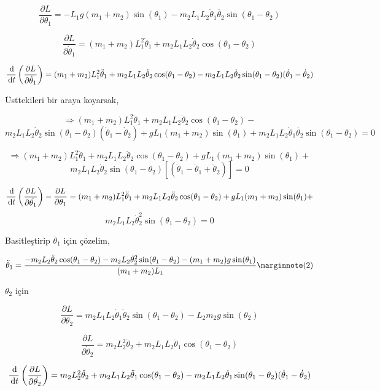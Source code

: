 \documentclass[12pt,fleqn]{article}\usepackage{../../common}
\begin{document}
$$
\frac{\partial L}{\partial \theta_1} = 
-L_1 g (m_1 + m_2) \sin(\theta_1) - m_2 L_1 L_2 \dot{\theta}_1\dot{\theta_2}\sin(\theta_1-\theta_2)
$$

$$
\frac{\partial L}{\partial \dot{\theta}_1} = 
(m_1 + m_2) L_1^2 \dot{\theta}_1 + m_2 L_1 L_2 \dot{\theta}_2 \cos(\theta_1- \theta_2)
$$
 
$$
\frac{\,\mathrm{d} }{\,\mathrm{d} t} \left(
\frac{\partial L}{\partial \dot{\theta}_1} \right) = 
(m_1 + m_2) L_1^2 \ddot{\theta}_1 + m_2 L_1 L_2 \ddot{\theta}_2 \cos(\theta_1-\theta_2)-
m_2 L_1 L_2 \dot{\theta}_2 \sin(\theta_1-\theta_2)(\dot{\theta}_1 - \dot{\theta}_2)
$$

Üsttekileri bir araya koyarsak,

$$
\Rightarrow (m_1 + m_2) L_1^2 \ddot{\theta}_1 + 
m_2L_1 L_2 \ddot{\theta}_2 \cos(\theta_1-\theta_2)-
$$
$$
m_2 L_1 L_2 \dot{\theta}_2 \sin(\theta_1-\theta_2)(\dot{\theta}_1 - \dot{\theta}_2) +
g L_1 (m_1 + m_2) \sin(\theta_1) + 
m_2 L_1 L_2 \dot{\theta}_1\dot{\theta_2}\sin(\theta_1-\theta_2)=0
$$

$$
\Rightarrow (m_1 + m_2) L_1^2 \ddot{\theta}_1 + 
m_2 L_1 L_2 \ddot{\theta}_2 \cos(\theta_1-\theta_2) +
g L_1 (m_1 + m_2) \sin(\theta_1) + 
$$
$$
m_2 L_1 L_2\dot{\theta}_2 \sin(\theta_1-\theta_2) \left[ (\dot{\theta}_1 - \dot{\theta}_1 + \dot{\theta}_2)  \right]
=0
$$

$$
\frac{\,\mathrm{d}}{\,\mathrm{d} t} \left(
\frac{\partial L}{\partial \dot{\theta_1}} 
\right) - \frac{\partial L}{\partial \theta_1} =  
(m_1 + m_2) L_1^2 \ddot{\theta}_1 + 
m_2 L_1 L_2 \ddot{\theta}_2 \cos(\theta_1-\theta_2) +
g L_1 (m_1 + m_2) \sin(\theta_1) + 
$$
$$
m_2 L_1 L_2\dot{\theta}_2^2 \sin(\theta_1-\theta_2) 
=0
$$

Basitleştirip $\ddot{\theta}_1$ için çözelim,

$$
\ddot{\theta}_1 = \frac{
-m_2 L_2 \ddot{\theta}_2 \cos (\theta_1-\theta_2) - 
m_2 L_2 \dot{\theta}_2^2 \sin(\theta_1 - \theta_2) - (m_1 + m_2) g \sin(\theta_1)
}
{(m_1 + m_2) L_1 }
\mlabel{2}
$$

$\theta_2$ için

$$
\frac{\partial L}{\partial \theta_2} = 
m_2 L_1 L_2 \dot{\theta}_1 \dot{\theta}_2 \sin(\theta_1 - \theta_2) - 
L_2 m_2 g \sin(\theta_2)
$$

$$
\frac{\partial L}{\partial \dot{\theta}_2 } = 
m_2 L_2^2 \dot{\theta}_2 + m_2 L_1 L_2 \dot{\theta}_1 \cos(\theta_1 - \theta_2)
$$

$$
\frac{\,\mathrm{d}}{\,\mathrm{d} t} \left(\frac{\partial L}{\partial \dot{\theta_2}}  \right) =
m_2 L_2^2 \ddot{\theta}_2 + m_2 L_1 L_2 \ddot{\theta}_1 \cos(\theta_1 - \theta_2)
- m_2 L_1 L_2 \dot{\theta}_1 \sin(\theta_1 - \theta_2)(\dot{\theta}_1 - \dot{\theta}_2)
$$
\end{document}
